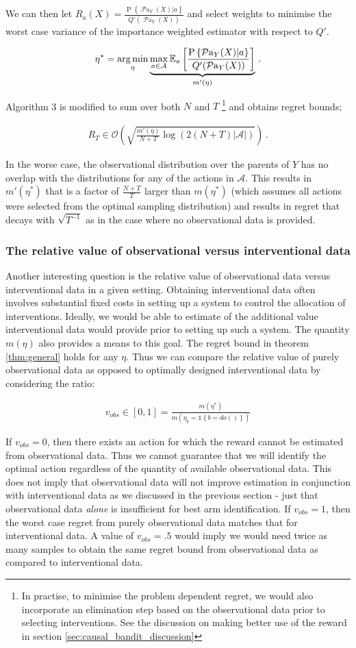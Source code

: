 \documentclass[11pt,a4paper,twoside]{report}
\newcommand{\EE}{\mathbb E}
\newcommand{\EEa}{\EE_a}
\newcommand{\Pn}[2]{\operatorname{P}\left\{#2|#1\right\}}
\newcommand{\calA}{\mathcal A}
\newcommand{\actionspace}{\mathcal{A}}
\newcommand{\set}[1]{\left\{#1\right\}}
\newcommand{\ind}[1]{\mathds{1}\!\!\set{#1}}
\newcommand{\argmin}{\operatornamewithlimits{arg\,min}}
\newcommand{\eqn}[1]{\begin{align}#1\end{align}}
\newcommand{\bigo}[1]{\mathcal{O}\left( #1 \right)}
\newcommand{\parents}[1]{\operatorname{\mathcal{P}a}_{#1}}
\newcommand{\simpleregret}{R_T}
\theoremstyle{plain}
\theoremstyle{definition}
\begin{document}
We can then let $R_a(X) = \frac{\Pn{a}{\parents{Y}(X)}}{Q'(\parents{Y}(X))}$ and select weights to minimise the worst case variance of the importance weighted estimator with respect to $Q'$. 

\eqn{
\eta^* 
 = \argmin_\eta \underbrace{\max_{a \in \calA} \EEa \left[\frac{\Pn{a}{\parents{Y}(X)}}{Q'(\parents{Y}(X))}\right]}_{m'(\eta)}\,.
}

Algorithm 3 is modified to sum over both $N$ and $T$ \footnote{In practise, to minimise the problem dependent regret, we would also incorporate an elimination step based on the observational data prior to selecting interventions. See the discussion on making better use of the reward in section \ref{sec:causal_bandit_discussion}} and obtains regret bounds;

\eqn{
\simpleregret \in \bigo{\sqrt{\frac{m'(\eta)}{N+T} \log\left(2(N+T)|\calA|\right)}}\,.
}

In the worse case, the observational distribution over the parents of $Y$ has no overlap with the distributions for any of the actions in $\actionspace$. This results in $m'(\eta^*)$ that is a factor of $\frac{N+T}{T}$ larger than $m(\eta^*)$ (which assumes all actions were selected from the optimal sampling distribution) and results in regret that decays with $\sqrt{T^{-1}}$ as in the case where no observational data is provided.  

\subsubsection{The relative value of observational versus interventional data} Another interesting question is the relative value of observational data versus interventional data in a given setting. Obtaining interventional data often involves substantial fixed costs in setting up a system to control the allocation of interventions. Ideally, we would be able to estimate of the additional value interventional data would provide prior to setting up such a system. The quantity $m(\eta)$ also provides a means to this goal. The regret bound in theorem \ref{thm:general} holds for any $\eta$. Thus we can compare the relative value of purely observational data as opposed to optimally designed interventional data by considering the ratio:

\eqn{
v_{obs} \in [0,1] = \frac{m(\eta^*)}{m(\eta_b = \ind{b=do()})}
}

If $v_{obs} = 0$, then there exists an action for which the reward cannot be estimated from observational data. Thus we cannot guarantee that we will identify the optimal action regardless of the quantity of available observational data. This does not imply that observational data will not improve estimation in conjunction with interventional data as we discussed in the previous section - just that observational data \emph{alone} is insufficient for best arm identification. If $v_{obs} = 1$, then the worst case regret from purely observational data matches that for interventional data. A value of $v_{obs} = .5$ would imply we would need twice as many samples to obtain the same regret bound from observational data as compared to interventional data. 
\end{document}
